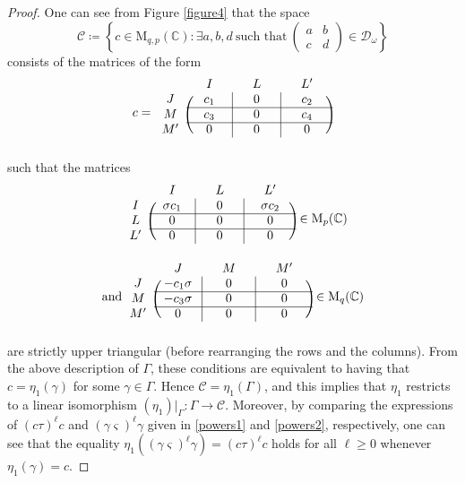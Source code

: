 \documentclass[11pt]{article}
\theoremstyle{definition}
\numberwithin{equation}{section}
\newcommand{\Mat}{\mathrm{M}}
\newcommand{\condir}{\mathcal{D}}
\newcommand{\mC}{\mathbb{C}}
\begin{document}
\begin{proof}
One can see from Figure \ref{figure4} that the space
\[
\mathcal{C}\coloneqq \left\{ c\in\Mat_{q,p}(\mC):\exists a,b,d\ \mbox{such that}\ \begin{pmatrix} a & b\\ c & d \end{pmatrix}\in\condir_\omega\right\}
\]
consists of the matrices of the form
\[
c=\begin{blockarray}{cccc}
{} & {\quad I\quad} & {\quad L\quad} & {\quad L'\quad}\\
\begin{block}{c(c|c|c)}
J & c_1 & 0 & c_2\\
\cline{2-4}
M & c_3 & 0 & c_4\\
\cline{2-4}
M' & 0 & 0 & 0\\
\end{block}
\end{blockarray}
\]
such that the matrices
\begin{eqnarray*}
 & \begin{blockarray}{cccc}
{} & {\quad I\quad} & {\quad L\quad} & {\quad L'\quad}\\
\begin{block}{c(c|c|c)}
I & \sigma c_1 & 0 & \sigma c_2\\
\cline{2-4}
L & 0 & 0 & 0\\
\cline{2-4}
L' & 0 & 0 & 0\\
\end{block}
\end{blockarray}\in\Mat_p(\mC)\\
\mbox{and}&
\begin{blockarray}{cccc}
{} & {\quad J\quad} & {\quad M\quad} & {\quad M'\quad}\\
\begin{block}{c(c|c|c)}
J & -c_1\sigma & 0 & 0\\
\cline{2-4}
M & -c_3\sigma & 0 & 0\\
\cline{2-4}
M' & 0 & 0 & 0\\
\end{block}
\end{blockarray}\in\Mat_q(\mC)
\end{eqnarray*}
are strictly upper triangular (before rearranging the rows and the columns). From the above description of $\Gamma$, these conditions are equivalent to having that $c=\eta_1(\gamma)$ for some $\gamma\in\Gamma$. Hence $\mathcal{C}=\eta_1(\Gamma)$, and this implies that $\eta_1$ restricts to a linear isomorphism $(\eta_1)|_\Gamma:\Gamma\to \mathcal{C}$.
Moreover, by comparing the expressions of $(c\tau)^\ell c$ and $(\gamma\varsigma)^\ell\gamma$ given in \eqref{powers1} and \eqref{powers2}, respectively, one can see that the equality $\eta_1((\gamma\varsigma)^\ell\gamma)=(c\tau)^\ell c$ holds for all $\ell\geq 0$ whenever $\eta_1(\gamma)=c$.


\end{proof}
\end{document}
